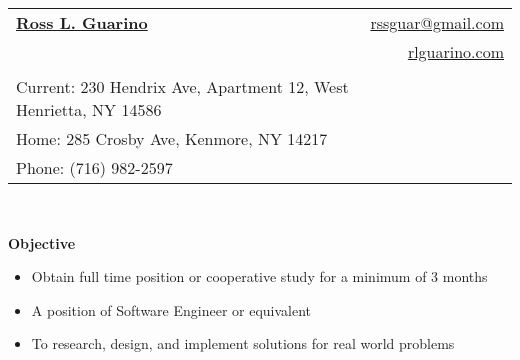 \documentclass[letterpaper,11pt]{article}
\newcommand{\resheading}[1]{{\large \colorbox{mygrey}{\begin{minipage}{\textwidth}{\textbf{#1 \vphantom{p\^{E}}}}\end{minipage}}}}
\begin{document}
 

\thispagestyle{empty}
\pagestyle{empty}

\newcommand{\mywebheader}{
\begin{tabular*}{7in}{l@{\extracolsep{\fill}}r} \\
  \textbf{\href{http://www.rlguarino.com/}{\large Ross L. Guarino}} & \href{mailto:rlguarino@gmail.com}{rssguar@gmail.com}\\ &
  \href{http://rlguarino.com/}{rlguarino.com} \\ \vspace{-10mm} \\
  {\footnotesize {{Current: 230 Hendrix Ave, Apartment 12,
West Henrietta, NY 14586}}} & \\
  {\footnotesize {{Home: 285 Crosby Ave, Kenmore, NY 14217}}} & \\
  {\footnotesize {{Phone: (716) 982-2597}}}   \end{tabular*}
\\
\vspace{0.1in}}

\mywebheader

\resheading{Objective}
{
  \begin{itemize}
  \setlength\itemsep{0em}
    \footnotesize
    \item{Obtain full time position or cooperative study for a minimum of 3 months}
    \item{A position of Software Engineer or equivalent}
    \item{To research, design, and implement solutions for real world problems}
  \end{itemize}
}

\end{document}
